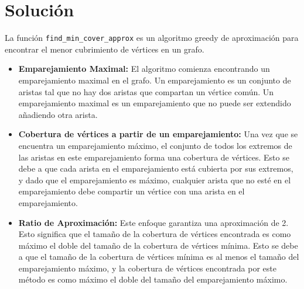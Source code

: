 \documentclass{article}
\begin{document}
\section{Solución}

La función \texttt{find\_min\_cover\_approx} es un algoritmo greedy de aproximación para encontrar el menor cubrimiento de vértices en un grafo.

\begin{itemize}
    \item \textbf{Emparejamiento Maximal:} El algoritmo comienza encontrando un emparejamiento maximal en el grafo. Un emparejamiento es un conjunto de aristas tal que no hay dos aristas que compartan un vértice común. Un emparejamiento maximal es un emparejamiento que no puede ser extendido añadiendo otra arista.
    \item \textbf{Cobertura de vértices a partir de un emparejamiento:} Una vez que se encuentra un emparejamiento máximo, el conjunto de todos los extremos de las aristas en este emparejamiento forma una cobertura de vértices. Esto se debe a que cada arista en el emparejamiento está cubierta por sus extremos, y dado que el emparejamiento es máximo, cualquier arista que no esté en el emparejamiento debe compartir un vértice con una arista en el emparejamiento.
    \item \textbf{Ratio de Aproximación:} Este enfoque garantiza una aproximación de 2. Esto significa que el tamaño de la cobertura de vértices encontrada es como máximo el doble del tamaño de la cobertura de vértices mínima. Esto se debe a que el tamaño de la cobertura de vértices mínima es al menos el tamaño del emparejamiento máximo, y la cobertura de vértices encontrada por este método es como máximo el doble del tamaño del emparejamiento máximo.
\end{itemize}
\end{document}
